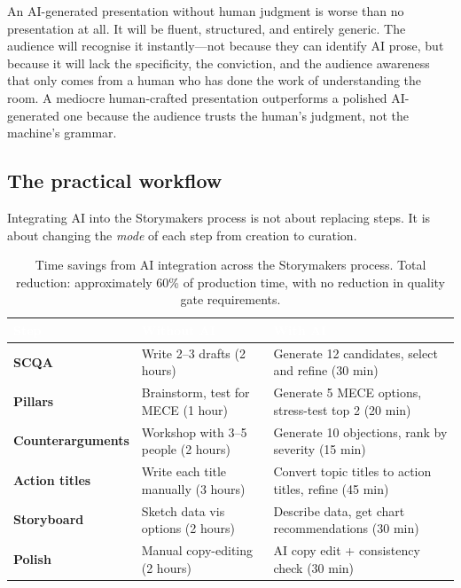 \begin{alertbox}
An AI-generated presentation without human judgment is worse than no presentation at all. It will be fluent, structured, and entirely generic. The audience will recognise it instantly---not because they can identify AI prose, but because it will lack the specificity, the conviction, and the audience awareness that only comes from a human who has done the work of understanding the room. A mediocre human-crafted presentation outperforms a polished AI-generated one because the audience trusts the human's judgment, not the machine's grammar.
\end{alertbox}

\subsection{The practical workflow}

Integrating AI into the Storymakers process is not about replacing steps. It is about changing the \emph{mode} of each step from creation to curation.

\begin{table}[H]
\centering
\small
{}
\begin{tabularx}{\textwidth}{>{\bfseries\color{heading}}l X X}
\toprule
\rowcolor{tableheader}
\textcolor{white}{\textbf{Step}} & \textcolor{white}{\textbf{Without AI}} & \textcolor{white}{\textbf{With AI}} \\
\midrule
SCQA & Write 2--3 drafts (2 hours) & Generate 12 candidates, select and refine (30 min) \\
Pillars & Brainstorm, test for MECE (1 hour) & Generate 5 MECE options, stress-test top 2 (20 min) \\
Counterarguments & Workshop with 3--5 people (2 hours) & Generate 10 objections, rank by severity (15 min) \\
Action titles & Write each title manually (3 hours) & Convert topic titles to action titles, refine (45 min) \\
Storyboard & Sketch data vis options (2 hours) & Describe data, get chart recommendations (30 min) \\
Polish & Manual copy-editing (2 hours) & AI copy edit + consistency check (30 min) \\
\bottomrule
\end{tabularx}
\caption{Time savings from AI integration across the Storymakers process. Total reduction: approximately 60\% of production time, with no reduction in quality gate requirements.}
\label{tab:ai-time-savings}
\end{table}

